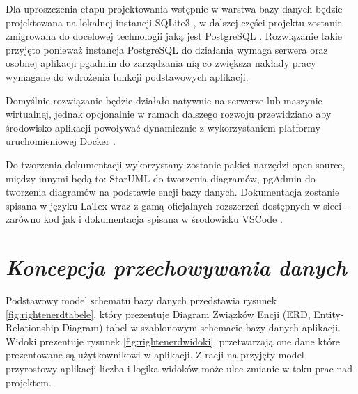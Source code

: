 \documentclass[a4paper,10pt, twoside]{report}
\newcommand{\customstylesection}[1]{\textbf{\textit{#1}}}
\begin{document}
\begin{large}
{Dla uproszczenia etapu projektowania wstępnie w warstwa bazy danych będzie 
projektowana na lokalnej instancji SQLite3 \cite{SQLite}, w dalszej części 
projektu zostanie zmigrowana do docelowej technologii jaką jest PostgreSQL 
\cite{PostgreSQL}. Rozwiązanie takie przyjęto ponieważ instancja PostgreSQL do 
działania wymaga serwera oraz osobnej aplikacji pgadmin \cite{pgAdmin} do 
zarządzania nią co zwiększa nakłady pracy wymagane do wdrożenia funkcji 
podstawowych aplikacji.}

{Domyślnie rozwiązanie będzie działało natywnie na serwerze lub maszynie 
wirtualnej, jednak opcjonalnie w ramach dalszego rozwoju przewidziano aby 
środowisko aplikacji powoływać dynamicznie z wykorzystaniem platformy 
uruchomieniowej Docker \cite{Docker}.}

{Do tworzenia dokumentacji wykorzystany zostanie pakiet narzędzi open source, 
między innymi będą to: StarUML \cite{StarUML} do tworzenia diagramów, pgAdmin 
\cite{pgAdmin} do tworzenia diagramów na podstawie encji bazy danych. 
Dokumentacja zostanie spisana w języku LaTex \cite{LaTeX} wraz z gamą 
oficjalnych rozszerzeń dostępnych w sieci - zarówno kod jak i dokumentacja 
spisana w środowisku VSCode \cite{VSCode}.}

\section{\customstylesection{Koncepcja przechowywania danych}}
{Podstawowy model schematu bazy danych przedstawia rysunek 
\ref{fig:rightenerdtabele}, który prezentuje Diagram Związków Encji (ERD, 
Entity-Relationship Diagram) tabel w szablonowym schemacie bazy danych 
aplikacji. Widoki prezentuje rysunek \ref{fig:rightenerdwidoki}, przetwarzają 
one dane które prezentowane są użytkownikowi w aplikacji. Z racji na przyjęty 
model przyrostowy aplikacji liczba i logika widoków może ulec zmianie w toku 
prac nad projektem.}


\end{large}
\end{document}
